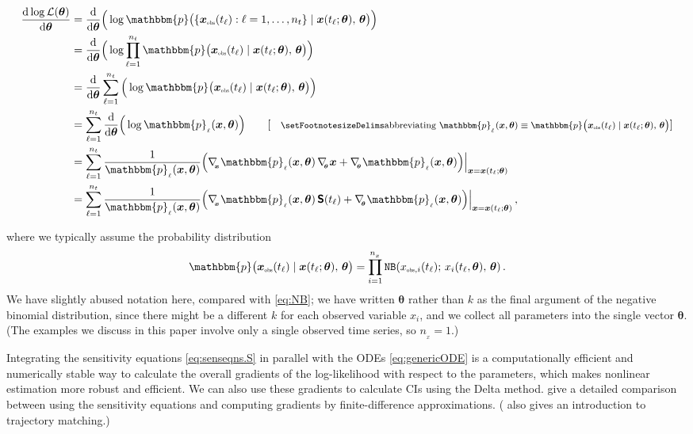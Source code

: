 \documentclass[]{interact}\usepackage[]{graphicx}\usepackage[]{xcolor}
\theoremstyle{plain}%
\theoremstyle{definition}
\theoremstyle{remark}
\newcommand{\dee}{{\rm d}}
\newcommand{\dd}[2]{{\frac{\dee{#1}}{\dee{#2}}}}
\newcommand{\xvec}{{\bm{x}}}
\newcommand{\thetavec}{{\bm{\theta}}}
\newcommand{\gradtheta}{\nabla_{{}_{\!\!\thetavec}}}
\newcommand{\gradx}{\nabla_{{}_{\!\!\xvec}}}
\newcommand{\pdens}{{\mathbbm{p}}} %
\newcommand{\pdenstindex}{\pdens_{{}_{\tindex}}}
\newcommand{\lik}{{\mathcal L}}
\newcommand{\traj}{x}
\newcommand{\sens}{{\mathsf S}}
\newcommand{\sensmat}{{\bm{\sens}}}
\newcommand{\tindex}{{\ell}}
\newcommand{\ti}{t_\tindex}
\newcommand{\tindexmax}{{n_t}}
\newcommand{\xindex}{{i}}
\newcommand{\xindexmax}{{n_{{}_x}}}
\newcommand{\trajobsi}{\traj_{{\rm{\color{black}\scalebox{0.5}{obs}}},\xindex}}
\newcommand{\trajobsiti}{\trajobsi(\ti)}
\newcommand{\xvecobssymbol}{\xvec_{{\rm{\color{black}\scalebox{0.5}{obs}}}}}
\newcommand{\xvecobs}[1]{\xvecobssymbol\!\left(#1\right)}
\newcommand{\xvecobsti}{\xvecobs{\ti}}
\begin{document}
\begin{linenomath*}
\begin{subequations}\label{eq:2nd.chain}
\begin{align}
  \dd{\,\log\lik(\thetavec)}{\thetavec}
  &= \dd{}{\thetavec}\Big(\log\pdens\big(\{\xvecobsti:\tindex=1,\dots,\tindexmax\} \mid \xvec(\ti;\thetavec),\,\thetavec\big)\Big) \\
  &= \dd{}{\thetavec}\Big(\log\prod_{\tindex=1}^{\tindexmax} \pdens\big(\xvecobsti \mid \xvec(\ti;\thetavec),\,\thetavec\big)\Big) \\
  &= \dd{}{\thetavec}\sum_{\tindex=1}^{\tindexmax} \Big(\log \pdens\big(\xvecobsti \mid \xvec(\ti;\thetavec),\,\thetavec\big)\Big) \\
  &= \sum_{\tindex=1}^{\tindexmax} \dd{}{\thetavec}\Big(\log \pdenstindex(\xvec,\thetavec)\Big)
     \qquad [\text{\footnotesize abbreviating $\pdenstindex(\xvec,\thetavec) \equiv
       \pdens\big(\xvecobsti \mid \xvec(\ti;\thetavec),\,\thetavec\big)$}]
       \\
  &= \sum_{\tindex=1}^{\tindexmax} \frac{1}{\pdenstindex(\xvec,\thetavec)}
  \Big( \gradx\pdenstindex(\xvec,\thetavec) \, \gradtheta\xvec
  + \gradtheta\pdenstindex(\xvec,\thetavec) \Big)\Big|_{\xvec=\xvec(\ti;\thetavec)} \\
  &= \sum_{\tindex=1}^{\tindexmax} \frac{1}{\pdenstindex(\xvec,\thetavec)}
  \Big( \gradx\pdenstindex(\xvec,\thetavec) \, \sensmat(\ti)
  + \gradtheta\pdenstindex(\xvec,\thetavec) \Big)\Big|_{\xvec=\xvec(\ti;\thetavec)}
 \,,
\end{align}
\end{subequations}
\end{linenomath*}
where we typically assume the probability distribution
\begin{equation}\label{eq:PopNB}
\pdens\big(\xvecobsti \mid \xvec(\ti;\thetavec),\,\thetavec\big) =
\prod_{\xindex=1}^\xindexmax\texttt{NB}(\trajobsiti;\, x_\xindex(\ti,\thetavec),\,\thetavec) \,.
\end{equation}
We have slightly abused notation here, compared with \cref{eq:NB}; we
have written $\thetavec$ rather than $k$ as the final argument of the
negative binomial distribution, since there might be a different $k$
for each observed variable $x_\xindex$, and we collect all parameters
into the single vector $\thetavec$.  (The examples we discuss in this
paper involve only a single observed time series, so $\xindexmax=1$.)

Integrating the sensitivity equations \eqref{eq:senseqns.S} in
parallel with the ODEs \eqref{eq:genericODE} is a computationally
efficient and numerically stable way to calculate the overall
gradients of the log-likelihood with respect to the parameters, which
makes nonlinear estimation more robust and efficient. We can also use
these gradients to calculate CIs using the Delta method.
\citet{raue2013lessons} give a detailed comparison between using the
sensitivity equations and computing gradients by finite-difference
approximations.  (\citet[Chapter~9]{bjorn2018} also gives an
introduction to trajectory matching.)
\end{document}
